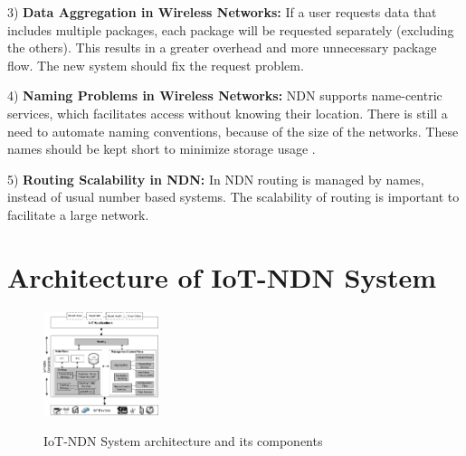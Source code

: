 \documentclass[conference]{IEEEtran}
\begin{document}
  
  
  3) \textbf{Data Aggregation in Wireless Networks:}
  If a user requests data that includes multiple packages, each package will be requested separately (excluding the others). This results in a greater overhead and more unnecessary package flow. The new system should fix the request problem.
  
  4) \textbf{Naming Problems in Wireless Networks:}
  NDN supports name-centric services, which facilitates access without knowing their location. There is still a need to automate naming conventions, because of the size of the networks. These names should be kept short to minimize storage usage \cite{b17}\cite{b18}. 
  
  
  5) \textbf{Routing Scalability in NDN:}
  In NDN routing is managed by names, instead of usual number based systems. The scalability of routing is important to facilitate a large network.
  
  \section{Architecture of IoT-NDN System}
  
  \begin{figure}[h]
      \centering
      \includegraphics[width=0.3\textwidth]{IoT-NDN_System_architecture_and_its_components.png}\\
      \caption{IoT-NDN System architecture and its components}
      \label{fig:enter-label}
  \end{figure}
  
\end{document}
